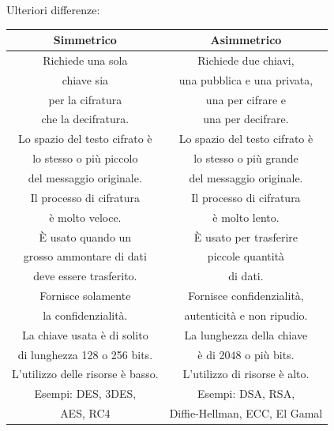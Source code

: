 \textsf{\small Ulteriori differenze: }

           

\begin{tabular}{|c|c|}
	\hline
	\textbf{Simmetrico} & \textbf{Asimmetrico} \\
	\hline
	\textsf{\small Richiede una sola  } & \textsf{\small Richiede due chiavi, } \\
	\textsf{\small chiave sia} & \textsf{\small  una pubblica e una privata,} \\
	\textsf{\small per la cifratura } & \textsf{\small una per cifrare e } \\
	\textsf{\small che la decifratura.} & \textsf{\small una per decifrare.} \\ %
	\hline
	\textsf{\small Lo spazio del testo cifrato è  } & \textsf{\small Lo spazio del testo cifrato è  } \\
	\textsf{\small lo stesso o più piccolo } & \textsf{\small lo stesso o più grande } \\
	\textsf{\small del messaggio originale.} & \textsf{\small del messaggio originale.} \\
	\hline
	\textsf{\small Il processo di cifratura } & \textsf{\small Il processo di cifratura } \\
	\textsf{\small è molto veloce.} & \textsf{\small è molto lento.} \\
	\hline
	\textsf{\small È usato quando un  } & \textsf{\small È usato per trasferire } \\
	\textsf{\small grosso ammontare di dati} & \textsf{\small piccole quantità} \\
	\textsf{\small deve essere trasferito.} & \textsf{\small  di dati.} \\
	\hline
	\textsf{\small Fornisce solamente } & \textsf{\small Fornisce confidenzialità, } \\ %
	\textsf{\small la confidenzialità.} & \textsf{\small autenticità e non ripudio.} \\ %
	\hline
	\textsf{\small La chiave usata è di solito } & \textsf{\small La lunghezza della chiave } \\
	\textsf{\small di lunghezza 128 o 256 bits.} & \textsf{\small è di 2048 o più bits.} \\
	\hline
	\textsf{\small L'utilizzo delle risorse è basso.} & \textsf{\small L'utilizzo di risorse è alto.} \\
	\hline
	\textsf{\small Esempi: DES, 3DES, } & \textsf{\small Esempi: DSA, RSA, } \\
	\textsf{\small AES, RC4} & \textsf{\small Diffie-Hellman, ECC, El Gamal} \\
	\hline
\end{tabular}

